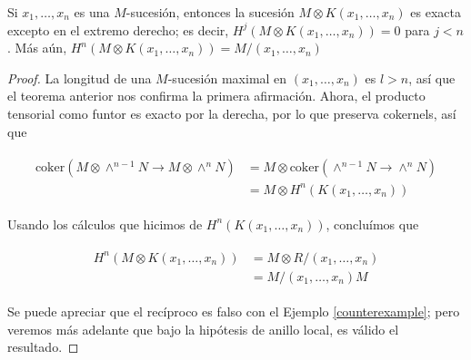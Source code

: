 \begin{corollary}
Si $x_1,\dots,x_n$ es una $M$-sucesión, entonces la sucesión $M\otimes K(x_1,\dots, x_n)$ es exacta excepto en el extremo derecho; es decir, $H^j(M\otimes K(x_1, \dots, x_n)) = 0$ para $j < n$. Más aún, $H^n(M\otimes K(x_1, \dots, x_n)) = M/(x_1, \dots, x_n)$
\end{corollary}
\begin{proof}
La longitud de una $M$-sucesión maximal en $(x_1, \dots, x_n)$  es $l>n$, así que el teorema anterior nos confirma la primera afirmación. Ahora, el producto tensorial como funtor es exacto por la derecha, por lo que preserva cokernels, así que

\begin{align*}
\begin{split}
\textrm{coker}(M\otimes\wedge^{n-1}N\rightarrow M\otimes\wedge^nN) & = M\otimes \textrm{coker}(\wedge^{n-1}N\rightarrow \wedge^nN)\\
& = M \otimes H^n(K(x_1,\dots,x_n))
\end{split}
\end{align*}

Usando los cálculos que hicimos de $H^n(K(x_1,\dots,x_n))$, concluímos que

\begin{align*}
\begin{split}
H^n(M\otimes K(x_1,\dots,x_n)) & = M\otimes R/(x_1,\dots,x_n)\\
& = M/(x_1,\dots,x_n)M
\end{split}
\end{align*}

Se puede apreciar que el recíproco es falso con el Ejemplo \ref{counterexample}; pero veremos más adelante que bajo la hipótesis de anillo local, es válido el resultado.


\end{proof}